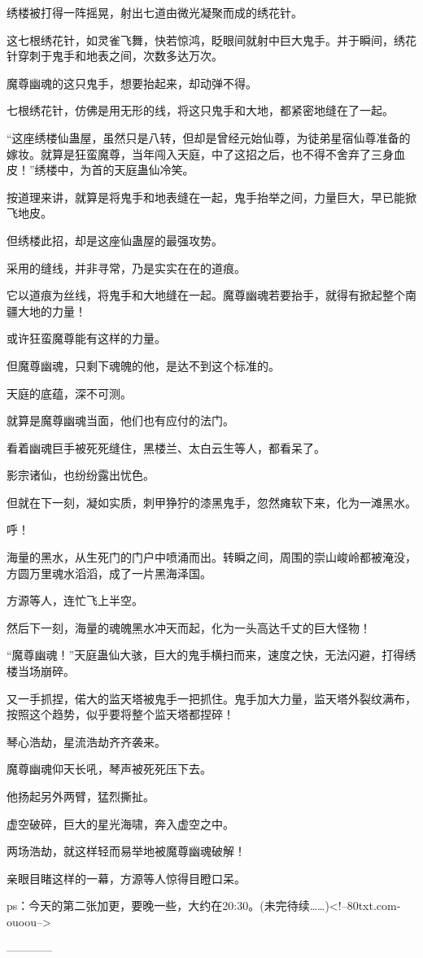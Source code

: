 \begin{this_body}
绣楼被打得一阵摇晃，射出七道由微光凝聚而成的绣花针。

这七根绣花针，如灵雀飞舞，快若惊鸿，眨眼间就射中巨大鬼手。并于瞬间，绣花针穿刺于鬼手和地表之间，次数多达万次。

魔尊幽魂的这只鬼手，想要抬起来，却动弹不得。

七根绣花针，仿佛是用无形的线，将这只鬼手和大地，都紧密地缝在了一起。

“这座绣楼仙蛊屋，虽然只是八转，但却是曾经元始仙尊，为徒弟星宿仙尊准备的嫁妆。就算是狂蛮魔尊，当年闯入天庭，中了这招之后，也不得不舍弃了三身血皮！”绣楼中，为首的天庭蛊仙冷笑。

按道理来讲，就算是将鬼手和地表缝在一起，鬼手抬举之间，力量巨大，早已能掀飞地皮。

但绣楼此招，却是这座仙蛊屋的最强攻势。

采用的缝线，并非寻常，乃是实实在在的道痕。

它以道痕为丝线，将鬼手和大地缝在一起。魔尊幽魂若要抬手，就得有掀起整个南疆大地的力量！

或许狂蛮魔尊能有这样的力量。

但魔尊幽魂，只剩下魂魄的他，是达不到这个标准的。

天庭的底蕴，深不可测。

就算是魔尊幽魂当面，他们也有应付的法门。

看着幽魂巨手被死死缝住，黑楼兰、太白云生等人，都看呆了。

影宗诸仙，也纷纷露出忧色。

但就在下一刻，凝如实质，刺甲狰狞的漆黑鬼手，忽然瘫软下来，化为一滩黑水。

呼！

海量的黑水，从生死门的门户中喷涌而出。转瞬之间，周围的崇山峻岭都被淹没，方圆万里魂水滔滔，成了一片黑海泽国。

方源等人，连忙飞上半空。

然后下一刻，海量的魂魄黑水冲天而起，化为一头高达千丈的巨大怪物！

“魔尊幽魂！”天庭蛊仙大骇，巨大的鬼手横扫而来，速度之快，无法闪避，打得绣楼当场崩碎。

又一手抓捏，偌大的监天塔被鬼手一把抓住。鬼手加大力量，监天塔外裂纹满布，按照这个趋势，似乎要将整个监天塔都捏碎！

琴心浩劫，星流浩劫齐齐袭来。

魔尊幽魂仰天长吼，琴声被死死压下去。

他扬起另外两臂，猛烈撕扯。

虚空破碎，巨大的星光海啸，奔入虚空之中。

两场浩劫，就这样轻而易举地被魔尊幽魂破解！

亲眼目睹这样的一幕，方源等人惊得目瞪口呆。

ps：今天的第二张加更，要晚一些，大约在20:30。(未完待续……)<!--80txt.com-ouoou-->

------------

\end{this_body}

